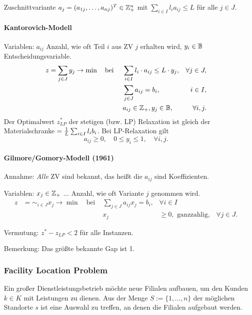 Zuschnittvariante $a_j = (a_{1j}, \ldots, a_{nj})^T \in \mathbb{Z}_+^n$ mit
$\sum_{i \in I} l_i a_{ij} \le L$ für alle $j \in J$.

\paragraph{Kantorovich-Modell}
Variablen: $a_{ij}$ Anzahl, wie oft Teil $i$ aus ZV $j$ erhalten wird, $y_i
\in \mathbb{B}$ Entscheidungsvariable.
\[ \begin{aligned}
    z &= \sum_{j \in J} y_j \to \min \quad \text{bei } &
    &\sum_{i \in I} l_i \cdot a_{ij} \le L \cdot y_j, & \forall j \in J, \\
    & &
    &\sum_{j \in J} a_{ij} = b_i, & i \in I, \\
    & &
    &a_{ij} \in \mathbb{Z}_+, y_j \in \mathbb{B}, & \forall i,j.
  \end{aligned} \]
Der Optimalwert $z_{LP}^*$ der stetigen (bzw. LP) Relaxation ist gleich der
Materialschranke $= \frac{1}{L} \sum_{i \in I} l_i b_i$. Bei LP-Relaxation gilt
\[ a_{ij} \ge 0, \quad 0 \le y_i \le 1, \quad \forall i, j. \]

\paragraph{Gilmore/Gomory-Modell (1961)}
Annahme: \emph{Alle} ZV sind bekannt, das heißt die $a_{ij}$ sind Koeffizienten.

Variablen: $x_j \in \mathbb{Z}_+$ ... Anzahl, wie oft Variante $j$ genommen wird.
\[ \begin{aligned}
    z &= \sim_{i \in J} x_j \to \min \quad \text{bei } &
    \sum_{j \in J} a_{ij} x_j = b_i, & \forall i \in I \\
    & &
    x_j &\ge 0, \text{ ganzzahlig}, & \forall j \in J.
  \end{aligned} \]

Vermutung: $z^* - z_{LP} < 2$ für alle Instanzen.

Bemerkung: Das größte bekannte Gap ist 1.

\subsubsection{Facility Location Problem}
Ein großer Dienstleistungsbetrieb möchte neue Filialen aufbauen, um den Kunden
$k \in K$ mit Leistungen zu dienen. Aus der Menge $S := \{1, \ldots, n\}$ der
möglichen Standorte $s$ ist eine Auswahl zu treffen, an denen die Filialen
aufgebaut werden.


